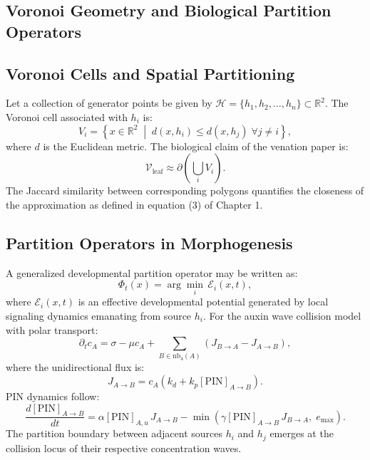 \documentclass[12pt, a4paper, openany]{book}
\theoremstyle{definition}
\theoremstyle{remark}
\begin{document}

\begin{appendices}

\chapter{Voronoi Geometry and Biological Partition Operators}

\section{Voronoi Cells and Spatial Partitioning}

Let a collection of generator points be given by $\mathcal{H} = \{h_1, h_2, \dots, h_n\} \subset \mathbb{R}^2$. The Voronoi cell associated with $h_i$ is:
\begin{equation}
V_i = \left\{ x \in \mathbb{R}^2 \;\middle|\; d(x,h_i) \leq d(x,h_j) \;\forall j \neq i \right\},
\end{equation}
where $d$ is the Euclidean metric. The biological claim of the venation paper is:
\begin{equation}
\mathcal{V}_{\text{leaf}} \approx \partial\!\left(\bigcup_i V_i\right).
\end{equation}
The Jaccard similarity between corresponding polygons quantifies the closeness of the approximation as defined in equation (3) of Chapter 1.

\section{Partition Operators in Morphogenesis}

A generalized developmental partition operator may be written as:
\begin{equation}
\Phi_t(x) = \arg\min_i \,\mathcal{E}_i(x,t),
\end{equation}
where $\mathcal{E}_i(x,t)$ is an effective developmental potential generated by local signaling dynamics emanating from source $h_i$. For the auxin wave collision model with polar transport:
\begin{equation}
\partial_t c_A = \sigma - \mu c_A + \sum_{B \in \mathrm{nb}_4(A)} (J_{B\to A} - J_{A\to B}),
\end{equation}
where the unidirectional flux is:
\begin{equation}
J_{A\to B} = c_A(k_d + k_p[\mathrm{PIN}]_{A\to B}).
\end{equation}
PIN dynamics follow:
\begin{equation}
\frac{d[\mathrm{PIN}]_{A\to B}}{dt} = \alpha[\mathrm{PIN}]_{A,u}\,J_{A\to B} - \min\!\left(\gamma[\mathrm{PIN}]_{A\to B}\,J_{B\to A},\; e_{\max}\right).
\end{equation}
The partition boundary between adjacent sources $h_i$ and $h_j$ emerges at the collision locus of their respective concentration waves.


\end{appendices}
\end{document}
